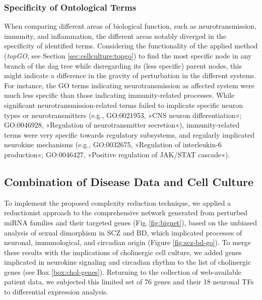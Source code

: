 \subsubsection{Specificity of Ontological Terms}
When comparing different areas of biological function, such as neurotransmission, immunity, and inflammation, the different areas notably diverged in the specificity of identified terms. Considering the functionality of the applied method (\emph{topGO}, see Section \ref{sec:cellculture:topgo}) to find the most specific node in any branch of the \ac{dag} tree while disregarding its (less specific) parent nodes, this might indicate a difference in the gravity of perturbation in the different systems. For instance, the GO terms indicating neurotransmission as affected system were much less specific than those indicating immunity-related processes. While significant neurotransmission-related terms failed to implicate specific neuron types or neurotransmitters (e.g., GO:0021953, »CNS neuron differentiation«; GO:0046928, »Regulation of neurotransmitter secretion«), immunity-related terms were very specific towards regulatory subsystems, and regularly implicated neurokine mechanisms (e.g., GO:0032675, »Regulation of interleukin-6 production«; GO:0046427, »Positive regulation of JAK/STAT cascade«).

\subsection{Combination of Disease Data and Cell Culture}
To implement the proposed complexity reduction technique, we applied a reductionist approach to the comprehensive network generated from perturbed miRNA families and their targeted genes (Fig.\,\ref{fig:bignet}), based on the unbiased analysis of sexual dimorphism in SCZ and BD, which implicated processes of neuronal, immunological, and circadian origin (Figure \ref{fig:scz-bd-go}). To merge these results with the implications of cholinergic cell culture, we added genes implicated in neurokine signaling and circadian rhythm to the list of cholinergic genes (see Box \ref{box:chol-genes}). Returning to the collection of web-available patient data, we subjected this limited set of 76 genes and their 18 neuronal TFs to differential expression analysis.

